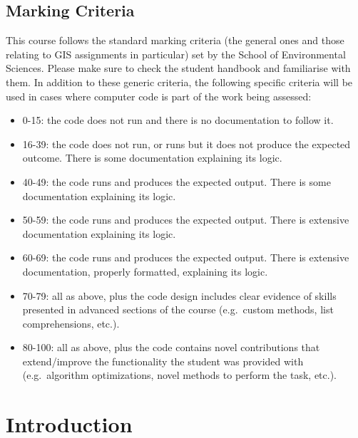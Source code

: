 \documentclass[
  letterpaper,
  DIV=11,
  numbers=noendperiod]{scrreprt}
\providecommand{\tightlist}{%
  \setlength{\itemsep}{0pt}\setlength{\parskip}{0pt}}\usepackage{longtable,booktabs,array}
\begin{document}
\hypertarget{marking-criteria}{%
\section*{Marking Criteria}\label{marking-criteria}}


This course follows the standard marking criteria (the general ones and
those relating to GIS assignments in particular) set by the School of
Environmental Sciences. Please make sure to check the student handbook
and familiarise with them. In addition to these generic criteria, the
following specific criteria will be used in cases where computer code is
part of the work being assessed:

\begin{itemize}
\tightlist
\item
  0-15: the code does not run and there is no documentation to follow
  it.
\item
  16-39: the code does not run, or runs but it does not produce the
  expected outcome. There is some documentation explaining its logic.
\item
  40-49: the code runs and produces the expected output. There is some
  documentation explaining its logic.
\item
  50-59: the code runs and produces the expected output. There is
  extensive documentation explaining its logic.
\item
  60-69: the code runs and produces the expected output. There is
  extensive documentation, properly formatted, explaining its logic.
\item
  70-79: all as above, plus the code design includes clear evidence of
  skills presented in advanced sections of the course (e.g.~custom
  methods, list comprehensions, etc.).
\item
  80-100: all as above, plus the code contains novel contributions that
  extend/improve the functionality the student was provided with
  (e.g.~algorithm optimizations, novel methods to perform the task,
  etc.).
\end{itemize}


\hypertarget{introduction-1}{%
\chapter{Introduction}\label{introduction-1}}
\end{document}
